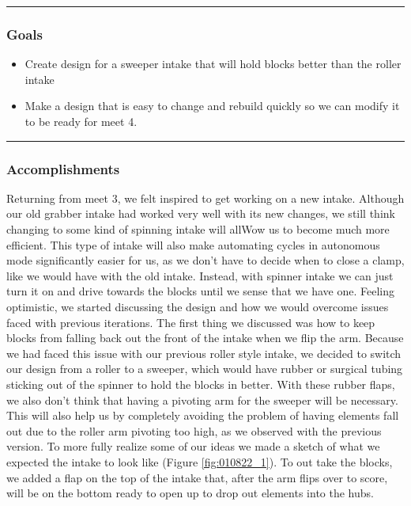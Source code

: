 \noindent\hfil\rule{\textwidth}{.4pt}\hfil
\subsubsection*{Goals}
\begin{itemize}
    \item Create design for a sweeper intake that will hold blocks better than the roller intake
    \item Make a design that is easy to change and rebuild quickly so we can modify it to be ready for meet 4.


\end{itemize} 

\noindent\hfil\rule{\textwidth}{.4pt}\hfil

\subsubsection*{Accomplishments}
Returning from meet 3, we felt inspired to get working on a new intake. Although our old grabber intake had worked very well with its new changes, we still think  changing to some kind of spinning intake will allWow us to become much more efficient. This type of intake will also make automating cycles in autonomous mode significantly easier for us, as we don't have to decide when to close a clamp, like we would have with the old intake. Instead, with spinner intake we can just turn it on and drive towards the blocks until we sense that we have one. Feeling optimistic, we started discussing the design and how we would overcome issues faced with previous iterations.
The first thing we discussed was how to keep blocks from falling back out the front of the intake when we flip the arm. Because we had faced this issue with our previous roller style intake, we decided to switch our design from a roller to a sweeper, which would have rubber or surgical tubing sticking out of the spinner to hold the blocks in better. With these rubber flaps, we also don't think that having a pivoting arm for the sweeper will be necessary. This will also help us by completely avoiding the problem of having elements fall out due to the roller arm pivoting too high, as we observed with the previous version. To more fully realize some of our ideas we made a sketch of what we expected the intake to  look like (Figure \ref{fig:010822_1}). To out take the blocks, we added a flap on the top of the intake that, after the arm flips over to score, will be on the bottom ready to open up to drop out elements into the hubs.
